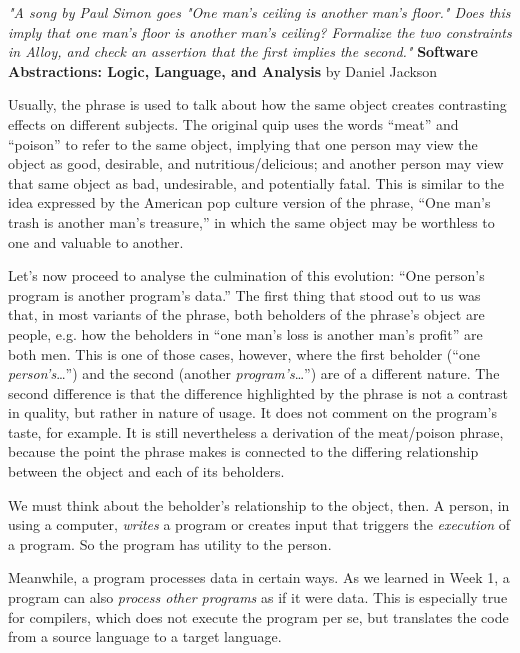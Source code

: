 \documentclass{article}
\begin{document}
\begin{quoting}
\textit{"A song by Paul Simon goes "One man's ceiling is another man's floor." Does this imply that one man's floor is another man's ceiling? Formalize the two constraints in Alloy, and check an assertion that the first implies the second."} \linebreak \linebreak
\textbf{Software Abstractions: Logic, Language, and Analysis} \linebreak by Daniel Jackson
\end{quoting}

Usually, the phrase is used to talk about how the same object creates contrasting effects on different subjects. The original quip uses the words “meat” and “poison” to refer to the same object, implying that one person may view the object as good, desirable, and nutritious/delicious; and another person may view that same object as bad, undesirable, and potentially fatal. This is similar to the idea expressed by the American pop culture version of the phrase, “One man’s trash is another man’s treasure,” in which the same object may be worthless to one and valuable to another.
\linebreak

Let’s now proceed to analyse the culmination of this evolution: “One person’s program is another program’s data.” The first thing that stood out to us was that, in most variants of the phrase, both beholders of the phrase’s object are people, e.g. how the beholders in “one man’s loss is another man’s profit” are both men. This is one of those cases, however, where the first beholder (“one \textit{person’s}…”) and the second (another \textit{program’s}…”) are of a different nature. The second difference is that the difference highlighted by the phrase is not a contrast in quality, but rather in nature of usage. It does not comment on the program’s taste, for example. It is still nevertheless a derivation of the meat/poison phrase, because the point the phrase makes is connected to the differing relationship between the object and each of its beholders.
\linebreak

We must think about the beholder’s relationship to the object, then. A person, in using a computer, \textit{writes} a program or creates input that triggers the \textit{execution} of a program. So the program has utility to the person.
\linebreak

Meanwhile, a program processes data in certain ways. As we learned in Week 1, a program can also \textit{process other programs} as if it were data. This is especially true for compilers, which does not execute the program per se, but translates the code from a source language to a target language.
\linebreak
\end{document}

